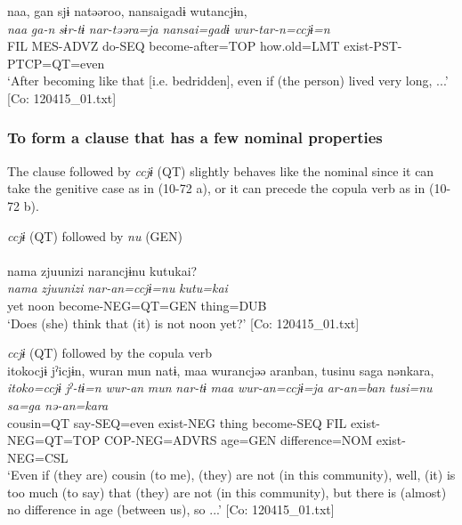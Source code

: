 \begin{xlist}
  \ex  %
      \glll    naa,  gan  sjɨ  natəəroo,  {\textbar}nansai{\textbar}gadɨ  wutancjɨn,\\
      \textit{naa}  \textit{ga-n}  \textit{sɨr-tɨ}  \textit{nar-təəra=ja}  \textit{nansai=gadɨ}  \textit{wur-tar-n=ccjɨ=n}\\
      FIL  MES-ADVZ  do-SEQ  become-after=TOP  how.old=LMT   exist-PST-PTCP=QT=even\\
      \glt       ‘After becoming like that [i.e. bedridden], even if (the person) lived very long, ...’ [Co: 120415\_01.txt]
    \z
\z

\subsubsection{To form a clause that has a few nominal properties}\label{sec:10.4.1.5}

The clause followed by \textit{ccjɨ} (QT) slightly behaves like the nominal since it can take the genitive case as in (10-72 a), or it can precede the copula verb as in (10-72 b).

\ea\label{ex:10.72} 
\ea \textit{ccjɨ} (QT) followed by \textit{nu} (GEN)\\\\
      \glll    nama  {\textbar}zjuunizi{\textbar}  narancjɨnu  kutukai?\\
    \textit{nama}  \textit{zjuunizi}  \textit{nar-an=ccjɨ=nu}  \textit{kutu=kai}\\
    yet  noon  become-NEG=QT=GEN  thing=DUB\\
\glt     ‘Does (she) think that (it) is not noon yet?’  [Co: 120415\_01.txt]

  \ex \textit{ccjɨ} (QT) followed by the copula verb\\
      \glll    {\textbar}itoko{\textbar}cjɨ  jˀicjɨn,  wuran  mun  natɨ,  {\textbar}maa{\textbar}   wurancjəə  aranban,  tusinu  {\textbar}sa{\textbar}ga  nənkara,\\
    \textit{itoko=ccjɨ}  \textit{jˀ-tɨ=n}  \textit{wur-an}  \textit{mun}  \textit{nar-tɨ}  \textit{maa} \textit{wur-an=ccjɨ=ja}  \textit{ar{}-an=ban  tusi=nu  sa=ga  nə-an=kara}\\
    cousin=QT  say-SEQ=even  exist-NEG  thing  become-SEQ  FIL exist-NEG=QT=TOP  COP-NEG=ADVRS  age=GEN  difference=NOM  exist-NEG=CSL\\
\glt     ‘Even if (they are) cousin (to me), (they) are not (in this community), well, (it) is too much (to say) that (they) are not (in this community), but there is (almost) no difference in age (between us), so ...’  [Co: 120415\_01.txt]
\z
\z


\end{xlist}
